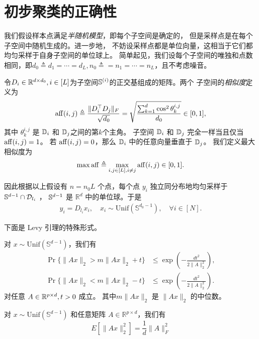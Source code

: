 \documentclass[main]{subfiles}
\begin{document}
\chapter{初步聚类的正确性}\label{chp:proof_greedy}
我们假设样本点满足\emph{半随机模型}，即每个子空间是确定的，
但是采样点是在每个子空间中随机生成的。进一步地，
不妨设采样点都是单位向量，这相当于它们都均匀采样于自身子空间的单位球上。
简单起见，我们设每个子空间的唯独和点数相同，即$d_0\triangleq d_1=\cdots=d_L,
n_0\triangleq = n_1=\cdots=n_L$，且不考虑噪音。

令$D_i\in \R^{d\times d_0}, i\in [L]$为子空间$\S^{(i)}$的正交基组成的矩阵。两个
子空间的\emph{相似度}定义为
\begin{align*}
  \aff(i,j) \triangleq \frac{\|D_i^\top D_j\|_F}{\sqrt{d_0}} =
  \sqrt{\frac{\sum_{k=1}^{d} \cos^2 \theta^{i,j}_k}{d_0}} \in [0,1],
\end{align*}
其中 $\theta^{i,j}_k$ 是 $\D_i$ 和 $\D_j$之间的第$k$个主角。
子空间 $\D_i$ 和 $\D_j$ 完全一样当且仅当 $\aff(i,j) = 1$。
若 $\aff(i,j) = 0$，那么 $\D_i$ 中的任意向量垂直于 $\D_j$。
我们定义最大相似度为
$$ \max \aff \triangleq \max_{i,j \in [L], i \neq j} \aff(i,j) \in [0,1].$$

因此根据以上假设有 $n = n_0 L$ 个点，每个点 $y_i$ 独立同分布地均匀采样于
$\S^{d-1} \cap \set{D}_{l_i}$ ， $\S^{d-1}$ 是 $\mathbb{R}^d$ 中的单位球。于是
\begin{align*}
  y_i = D_{l_i} x_i ,\quad x_i \sim \text{Unif}(\mathbb{S}^{d_0-1}) ,\quad
  \forall i \in [N].
\end{align*}

下面是 Levy 引理的特殊形式。
\begin{lemma} \label{lem:measureconc}
对 $x \sim \text{Unif}(\mathbb{S}^{d-1})$，我们有
\begin{align*} 
\Pr \{ \| A x \|_2  > m\|A x\|_2 + t \} &\le \exp \left( - \frac{dt^2}{2\|A\|_2^2} \right), \\
\Pr \{ \| A x \|_2  < m\|A x\|_2 - t \} &\le \exp \left( - \frac{dt^2}{2\|A\|_2^2} \right).
\end{align*}
对任意 $A \in \R^{p \times d}, t > 0$ 成立。 其中$m\|Ax\|_2$ 是 $\|Ax\|_2$ 的中位数。
\end{lemma}

\begin{lemma} \label{lem:expectation}
  对 $x \sim \text{Unif}(\mathbb{S}^{d-1})$ 和任意矩阵 
  $A \in \mathbb{R}^{p \times d}$，我们有
  $$ E[\|Ax\|_2^2] = \frac{1}{d} \|A\|_F^2 $$
\end{lemma}
\end{document}
